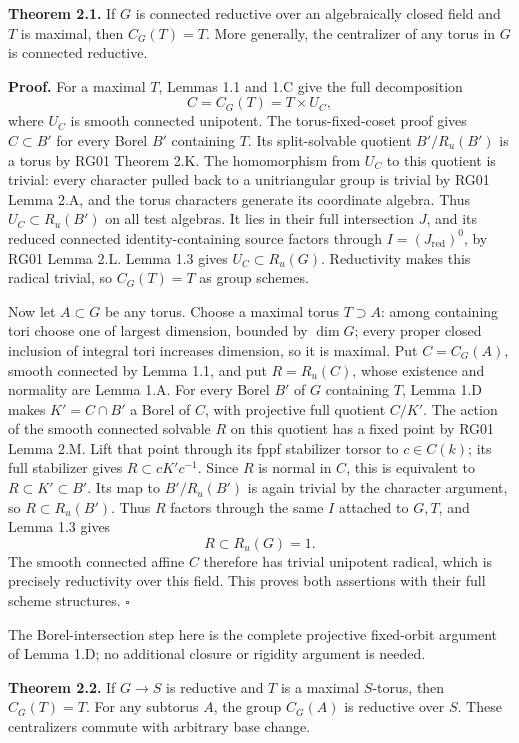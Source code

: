 \documentclass[11pt,a4paper,openany]{report}
\begin{document}
\textbf{Theorem 2.1.} If \(G\) is connected reductive over an algebraically closed field and \(T\) is maximal, then \(C_G(T)=T\). More generally, the centralizer of any torus in \(G\) is connected reductive.

\textbf{Proof.} For a maximal \(T\), Lemmas 1.1 and 1.C give the full decomposition \[
 C=C_G(T)=T\times U_C,
\] where \(U_C\) is smooth connected unipotent. The torus-fixed-coset proof gives \(C\subset B'\) for every Borel \(B'\) containing \(T\). Its split-solvable quotient \(B'/R_u(B')\) is a torus by RG01 Theorem 2.K. The homomorphism from \(U_C\) to this quotient is trivial: every character pulled back to a unitriangular group is trivial by RG01 Lemma 2.A, and the torus characters generate its coordinate algebra. Thus \(U_C\subset R_u(B')\) on all test algebras. It lies in their full intersection \(J\), and its reduced connected identity-containing source factors through \(I=(J_{\mathrm{red}})^0\), by RG01 Lemma 2.L. Lemma 1.3 gives \(U_C\subset R_u(G)\). Reductivity makes this radical trivial, so \(C_G(T)=T\) as group schemes.

Now let \(A\subset G\) be any torus. Choose a maximal torus \(T\supset A\): among containing tori choose one of largest dimension, bounded by \(\dim G\); every proper closed inclusion of integral tori increases dimension, so it is maximal. Put \(C=C_G(A)\), smooth connected by Lemma 1.1, and put \(R=R_u(C)\), whose existence and normality are Lemma 1.A. For every Borel \(B'\) of \(G\) containing \(T\), Lemma 1.D makes \(K'=C\cap B'\) a Borel of \(C\), with projective full quotient \(C/K'\). The action of the smooth connected solvable \(R\) on this quotient has a fixed point by RG01 Lemma 2.M. Lift that point through its fppf stabilizer torsor to \(c\in C(k)\); its full stabilizer gives \(R\subset cK'c^{-1}\). Since \(R\) is normal in \(C\), this is equivalent to \(R\subset K'\subset B'\). Its map to \(B'/R_u(B')\) is again trivial by the character argument, so \(R\subset R_u(B')\). Thus \(R\) factors through the same \(I\) attached to \(G,T\), and Lemma 1.3 gives \[
 R\subset R_u(G)=1.
\] The smooth connected affine \(C\) therefore has trivial unipotent radical, which is precisely reductivity over this field. This proves both assertions with their full scheme structures. \(\square\)

The Borel-intersection step here is the complete projective fixed-orbit argument of Lemma 1.D; no additional closure or rigidity argument is needed.

\textbf{Theorem 2.2.} If \(G\to S\) is reductive and \(T\) is a maximal \(S\)-torus, then \(C_G(T)=T\). For any subtorus \(A\), the group \(C_G(A)\) is reductive over \(S\). These centralizers commute with arbitrary base change.
\end{document}
